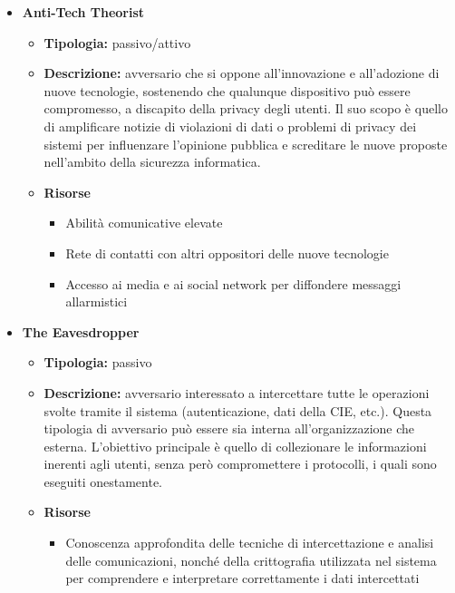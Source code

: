     \begin{itemize}
        \item \textbf{Anti-Tech Theorist}
            \begin{itemize}
                \item \textbf{Tipologia:} passivo/attivo
                
                \item \textbf{Descrizione:} avversario che si oppone all’innovazione e all'adozione di nuove tecnologie, sostenendo che qualunque dispositivo può essere compromesso, a discapito della privacy degli utenti.
                Il suo scopo è quello di amplificare notizie di violazioni di dati o problemi di privacy dei sistemi per influenzare l’opinione pubblica e screditare le nuove proposte nell'ambito della sicurezza informatica.
               
                \item \textbf{Risorse}
                    \begin{itemize}
                        \item Abilità comunicative elevate

                        \item Rete di contatti con altri oppositori delle nuove tecnologie

                        \item Accesso ai media e ai social network per diffondere messaggi allarmistici
                    \end{itemize}
            \end{itemize}


        \item \textbf{The Eavesdropper}
            \begin{itemize}
                \item \textbf{Tipologia:} passivo
                
                \item \textbf{Descrizione:} avversario interessato a intercettare tutte le operazioni svolte tramite il sistema (autenticazione, dati della CIE, etc.).
                Questa tipologia di avversario può essere sia interna all’organizzazione che esterna.
                L'obiettivo principale è quello di collezionare le informazioni inerenti agli utenti, senza però compromettere i protocolli, i quali sono eseguiti onestamente.
                
                \item \textbf{Risorse}
                    \begin{itemize}
                        \item Conoscenza approfondita delle tecniche di intercettazione e analisi delle comunicazioni, nonché della crittografia utilizzata nel sistema per comprendere e interpretare correttamente i dati intercettati


\end{itemize}
\end{itemize}
\end{itemize}
